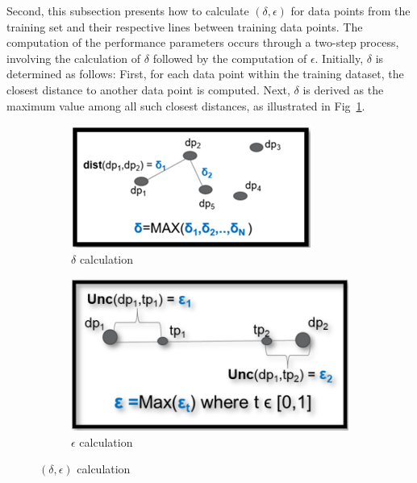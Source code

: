  
Second, this subsection presents how to calculate $(\delta,\epsilon)$ for data points from the training set and their respective lines between training data points. The computation of the performance parameters occurs through a two-step process, involving the calculation of $\delta$ followed by the computation of $\epsilon$. Initially, $\delta$ is determined as follows: First, for each data point within the training dataset, the closest distance to another data point is computed. Next, $\delta$ is derived as the maximum value among all such closest distances, as illustrated in Fig~\ref{fig:delta}.
\begin{figure}
\centering
\begin{subfigure}{.24\textwidth}
    \centering
    \includegraphics[width=1\linewidth]{Fig/OOD_delta.png}  
    \caption{$\delta$ calculation}
    \label{fig:delta}
\end{subfigure}
\begin{subfigure}{.24\textwidth}
    \centering
    \includegraphics[width=0.93\linewidth]{Fig/OOD_epsilon.png}  
    \caption{$\epsilon$ calculation}
    \label{fig:epsilon}
 \end{subfigure}
\caption{$(\delta,\epsilon)$ calculation}
\label{FIGURE LABEL}
\end{figure}
